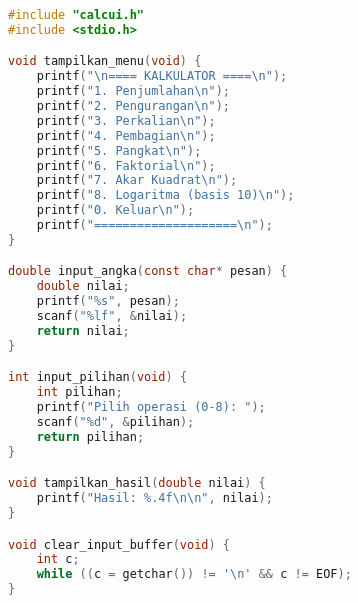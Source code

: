 \documentclass[../main.tex]{subfiles}
\begin{document}
\begin{lstlisting}[language=C, caption={calcui.c - implementasi UI}]
#include "calcui.h"
#include <stdio.h>

void tampilkan_menu(void) {
    printf("\n==== KALKULATOR ====\n");
    printf("1. Penjumlahan\n");
    printf("2. Pengurangan\n");
    printf("3. Perkalian\n");
    printf("4. Pembagian\n");
    printf("5. Pangkat\n");
    printf("6. Faktorial\n");
    printf("7. Akar Kuadrat\n");
    printf("8. Logaritma (basis 10)\n");
    printf("0. Keluar\n");
    printf("====================\n");
}

double input_angka(const char* pesan) {
    double nilai;
    printf("%s", pesan);
    scanf("%lf", &nilai);
    return nilai;
}

int input_pilihan(void) {
    int pilihan;
    printf("Pilih operasi (0-8): ");
    scanf("%d", &pilihan);
    return pilihan;
}

void tampilkan_hasil(double nilai) {
    printf("Hasil: %.4f\n\n", nilai);
}

void clear_input_buffer(void) {
    int c;
    while ((c = getchar()) != '\n' && c != EOF);
}
\end{lstlisting}
\end{document}
